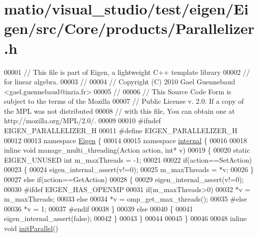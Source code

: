 \hypertarget{matio_2visual__studio_2test_2eigen_2_eigen_2src_2_core_2products_2_parallelizer_8h_source}{}\section{matio/visual\+\_\+studio/test/eigen/\+Eigen/src/\+Core/products/\+Parallelizer.h}
\label{matio_2visual__studio_2test_2eigen_2_eigen_2src_2_core_2products_2_parallelizer_8h_source}

\begin{DoxyCode}
00001 \textcolor{comment}{// This file is part of Eigen, a lightweight C++ template library}
00002 \textcolor{comment}{// for linear algebra.}
00003 \textcolor{comment}{//}
00004 \textcolor{comment}{// Copyright (C) 2010 Gael Guennebaud <gael.guennebaud@inria.fr>}
00005 \textcolor{comment}{//}
00006 \textcolor{comment}{// This Source Code Form is subject to the terms of the Mozilla}
00007 \textcolor{comment}{// Public License v. 2.0. If a copy of the MPL was not distributed}
00008 \textcolor{comment}{// with this file, You can obtain one at http://mozilla.org/MPL/2.0/.}
00009 
00010 \textcolor{preprocessor}{#ifndef EIGEN\_PARALLELIZER\_H}
00011 \textcolor{preprocessor}{#define EIGEN\_PARALLELIZER\_H}
00012 
00013 \textcolor{keyword}{namespace }\hyperlink{namespace_eigen}{Eigen} \{
00014 
00015 \textcolor{keyword}{namespace }\hyperlink{namespaceinternal}{internal} \{
00016 
00018 \textcolor{keyword}{inline} \textcolor{keywordtype}{void} manage\_multi\_threading(Action action, \textcolor{keywordtype}{int}* v)
00019 \{
00020   \textcolor{keyword}{static} EIGEN\_UNUSED \textcolor{keywordtype}{int} m\_maxThreads = -1;
00021 
00022   \textcolor{keywordflow}{if}(action==SetAction)
00023   \{
00024     eigen\_internal\_assert(v!=0);
00025     m\_maxThreads = *v;
00026   \}
00027   \textcolor{keywordflow}{else} \textcolor{keywordflow}{if}(action==GetAction)
00028   \{
00029     eigen\_internal\_assert(v!=0);
00030 \textcolor{preprocessor}{    #ifdef EIGEN\_HAS\_OPENMP}
00031     \textcolor{keywordflow}{if}(m\_maxThreads>0)
00032       *v = m\_maxThreads;
00033     \textcolor{keywordflow}{else}
00034       *v = omp\_get\_max\_threads();
00035 \textcolor{preprocessor}{    #else}
00036     *v = 1;
00037 \textcolor{preprocessor}{    #endif}
00038   \}
00039   \textcolor{keywordflow}{else}
00040   \{
00041     eigen\_internal\_assert(\textcolor{keyword}{false});
00042   \}
00043 \}
00044 
00045 \}
00046 
00048 \textcolor{keyword}{inline} \textcolor{keywordtype}{void} \hyperlink{namespace_eigen_a820c0e0460934cc17eb6dacbad54a9f5}{initParallel}()

\end{DoxyCode}
